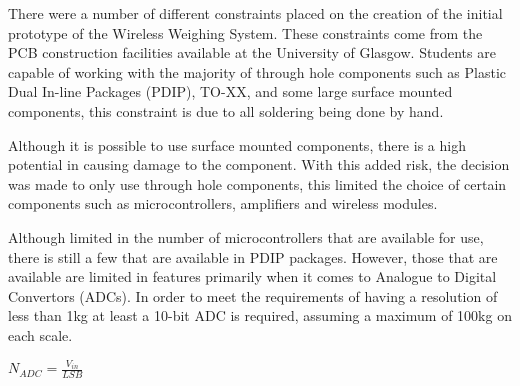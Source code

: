 There were a number of different constraints placed on the creation of the initial prototype of the Wireless Weighing System. These constraints come from the PCB construction facilities available at the University of Glasgow. Students are capable of working with the majority of through hole components such as Plastic Dual In-line Packages (PDIP), TO-XX, and some large surface mounted components, this constraint is due to all soldering being done by hand.

Although it is possible to use surface mounted components, there is a high potential in causing damage to the component. With this added risk, the decision was made to only use through hole components, this limited the choice of certain components such as microcontrollers, amplifiers and wireless modules.

Although limited in the number of microcontrollers that are available for use, there is still a few that are available in PDIP packages. However, those that are available are limited in features primarily when it comes to Analogue to Digital Convertors (ADCs). In order to meet the requirements of having a resolution of less than 1kg at least a 10-bit ADC is required, assuming a maximum of 100kg on each scale.

\begin{center}
$N_{ADC} = \frac{V_{in}}{LSB}$
\end{center}